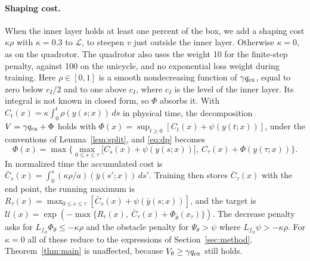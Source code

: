 \paragraph{Shaping cost.} When the inner layer holds at least one percent of the box, we add a shaping cost $\kappa\rho$ with $\kappa=0.3$ to $\mathcal L$, to steepen $v$ just outside the inner layer. Otherwise $\kappa=0$, as on the quadrotor. The quadrotor also uses the weight 10 for the finite-step penalty, against 100 on the unicycle, and no exponential loss weight during training. Here $\rho\in[0,1]$ is a smooth nondecreasing function of $\gamma q_{\mathrm{ex}}$, equal to zero below $c_I/2$ and to one above $c_I$, where $c_I$ is the level of the inner layer. Its integral is not known in closed form, so $\Phi$ absorbs it. With $C_t(x)=\kappa\int_0^t\rho(y(s;x))\,ds$ in physical time, the decomposition $V=\gamma q_{\mathrm{ex}}+\Phi$ holds with $\Phi(x)=\sup_{t\ge0}[C_t(x)+\psi(y(t;x))]$, under the conventions of Lemma~\ref{lem:split}, and \eqref{eq:dp} becomes
\begin{equation}\label{eq:dpk}
\Phi(x)=\max\Big\{\max_{0\le s\le\tau}\big[C_s(x)+\psi(y(s;x))\big],\ C_\tau(x)+\Phi(y(\tau;x))\Big\}.
\end{equation}
In normalized time the accumulated cost is $\bar C_s(x)=\int_0^s(\kappa\rho/a)(\bar y(s';x))\,ds'$. Training then stores $\bar C_\tau(x)$ with the end point, the running maximum is $R_\tau(x)=\max_{0\le s\le\tau}[\bar C_s(x)+\psi(\bar y(s;x))]$, and the target is $\mathcal U(x)=\exp(-\max\{R_\tau(x),\ \bar C_\tau(x)+\Phi_{\bar\theta}(x_\tau)\})$. The decrease penalty asks for $L_{f_{\mathrm{cl}}}\Phi_\theta\le-\kappa\rho$ and the obstacle penalty for $\Psi_\theta>\psi$ where $L_{f_{\mathrm{cl}}}\psi>-\kappa\rho$. For $\kappa=0$ all of these reduce to the expressions of Section~\ref{sec:method}. Theorem~\ref{thm:main} is unaffected, because $V_\theta\ge\gamma q_{\mathrm{ex}}$ still holds.

